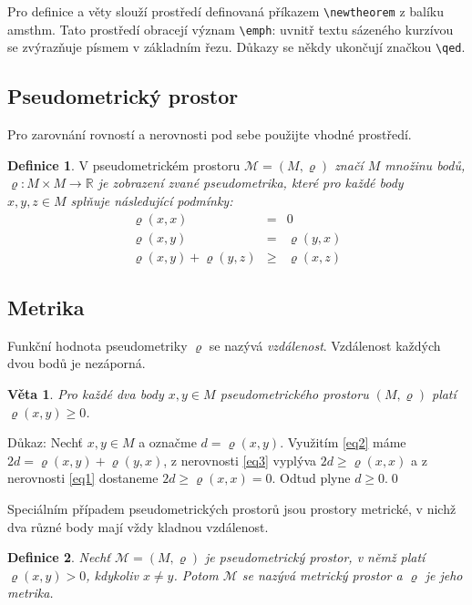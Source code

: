 \documentclass[a4paper, 11pt, twocolumn]{article}
\theoremstyle{definition}
\newtheorem{definition}{Definice}
\theoremstyle{definition}
\newtheorem{sentence}{Věta}
\begin{document}
Pro definice a věty slouží prostředí definovaná příkazem \texttt{\textbackslash newtheorem} z balíku amsthm.
Tato prostředí obracejí význam \texttt{\textbackslash emph}:
uvnitř textu sázeného kurzívou se zvýrazňuje písmem v základním řezu.
Důkazy se někdy ukončují značkou \texttt{\textbackslash qed}.

\subsection{Pseudometrický prostor}
Pro zarovnání rovností a nerovnosti pod sebe použijte vhodné prostředí.

\begin{definition}
V pseudometrickém prostoru \emph{$\mathcal{M}=(M,\varrho)$ značí $M$ množinu bodů,
$\varrho: M\times M\rightarrow\mathbb{R}$ je zobrazení zvané \emph{pseudometrika}, které pro každé body $x,y,z\in M$ splňuje následující podmínky:}
\begin{eqnarray}
\label{eq1}\varrho(x,x)&=&0\\
\label{eq2}\varrho(x,y)&=&\varrho(y,x)\\
\label{eq3}\varrho(x,y)+\varrho(y,z)&\geq&\varrho(x,z)
\end{eqnarray}
\end{definition}

\subsection{Metrika}
Funkční hodnota pseudometriky $\varrho$ se nazývá \emph{vzdálenost}.
Vzdálenost každých dvou bodů je nezáporná.
\begin{sentence}\label{veta1}
\emph{Pro každé dva body $x,y\in M$ pseudometrického prostoru $(M,\varrho)$ platí $\varrho(x,y)\geq0$.}
\end{sentence}

Důkaz: Nechť $x,y\in M$ a označme $d=\varrho(x,y)$. Využitím \eqref{eq2} máme $2d=\varrho(x,y)+\varrho(y,x)$, z nerovnosti \eqref{eq3} vyplýva $2d\geq\varrho(x,x)$ a z nerovnosti \eqref{eq1} dostaneme $2d\geq\varrho(x,x)=0$. Odtud plyne $d\geq0$.\qed

Speciálním případem pseudometrických prostorů jsou prostory metrické, v nichž dva různé body mají vždy kladnou vzdálenost.

\begin{definition}\label{def2}
\emph{Nechť $\mathcal{M}=(M,\varrho)$ je pseudometrický prostor, v němž platí $\varrho(x,y)>0$, kdykoliv $x\neq y$. Potom $\mathcal{M}$ se nazývá metrický prostor a $\varrho$ je jeho metrika.}
\end{definition}
\end{document}

